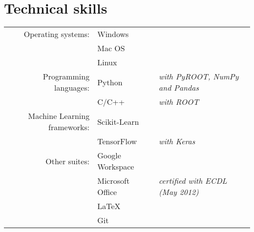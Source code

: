 \section*{Technical skills}
\begin{tabular}{rll}
  {\small Operating systems:} & Windows\\
    & Mac OS\\
    & Linux\\ [3mm]
                                        
  {\small Programming languages:} 
    & Python & {\small \emph {with PyROOT, NumPy and Pandas}}\\
    & C/C++ & {\small \emph {with ROOT}}\\ [3mm]
            
  {\small Machine Learning frameworks:} 
    & Scikit-Learn\\
    & TensorFlow & {\small \emph {with Keras}}\\ [3 mm]
                                            
  {\small Other suites:} 
    & Google Workspace\\
    & Microsoft Office & {\small \emph {certified with ECDL (May 2012)}}\\
    & \LaTeX\\
    & Git
\end{tabular}